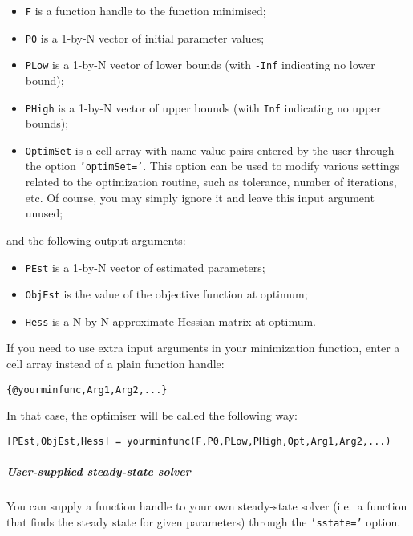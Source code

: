 \begin{itemize}
\itemsep1pt\parskip0pt
\item
  \texttt{F} is a function handle to the function minimised;
\item
  \texttt{P0} is a 1-by-N vector of initial parameter values;
\item
  \texttt{PLow} is a 1-by-N vector of lower bounds (with \texttt{-Inf}
  indicating no lower bound);
\item
  \texttt{PHigh} is a 1-by-N vector of upper bounds (with \texttt{Inf}
  indicating no upper bounds);
\item
  \texttt{OptimSet} is a cell array with name-value pairs entered by the
  user through the option \texttt{'optimSet='}. This option can be used
  to modify various settings related to the optimization routine, such
  as tolerance, number of iterations, etc. Of course, you may simply
  ignore it and leave this input argument unused;
\end{itemize}

and the following output arguments:

\begin{itemize}
\itemsep1pt\parskip0pt
\item
  \texttt{PEst} is a 1-by-N vector of estimated parameters;
\item
  \texttt{ObjEst} is the value of the objective function at optimum;
\item
  \texttt{Hess} is a N-by-N approximate Hessian matrix at optimum.
\end{itemize}

If you need to use extra input arguments in your minimization function,
enter a cell array instead of a plain function handle:

\begin{verbatim}
{@yourminfunc,Arg1,Arg2,...}
\end{verbatim}

In that case, the optimiser will be called the following way:

\begin{verbatim}
[PEst,ObjEst,Hess] = yourminfunc(F,P0,PLow,PHigh,Opt,Arg1,Arg2,...)
\end{verbatim}

\subparagraph{User-supplied steady-state
solver}

You can supply a function handle to your own steady-state solver (i.e.~a
function that finds the steady state for given parameters) through the
\texttt{'sstate='} option.

